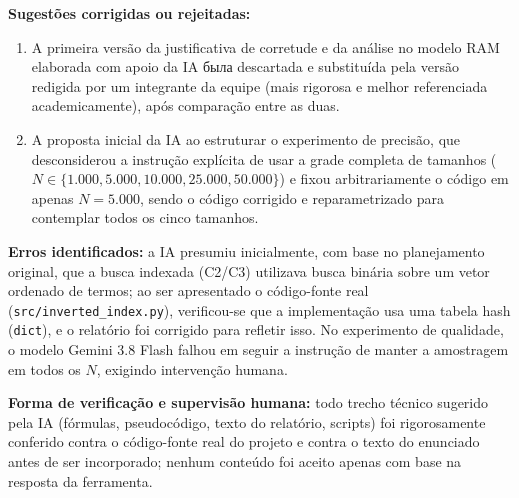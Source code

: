 \documentclass[12pt, a4paper]{article}
\begin{document}
\textbf{Sugestões corrigidas ou rejeitadas:}
\begin{enumerate}
    \item A primeira versão da justificativa de corretude e da análise no modelo RAM elaborada com apoio da IA была descartada e substituída pela versão redigida por um integrante da equipe (mais rigorosa e melhor referenciada academicamente), após comparação entre as duas.
    
    \item A proposta inicial da IA ao estruturar o experimento de precisão, que desconsiderou a instrução explícita de usar a grade completa de tamanhos ($N \in \{1.000, 5.000, 10.000, 25.000, 50.000\}$) e fixou arbitrariamente o código em apenas $N=5.000$, sendo o código corrigido e reparametrizado para contemplar todos os cinco tamanhos.
\end{enumerate}

\textbf{Erros identificados:} a IA presumiu inicialmente, com base no planejamento original, que a busca indexada (C2/C3) utilizava busca binária sobre um vetor ordenado de termos; ao ser apresentado o código-fonte real (\texttt{src/inverted\_index.py}), verificou-se que a implementação usa uma tabela hash (\texttt{dict}), e o relatório foi corrigido para refletir isso. No experimento de qualidade, o modelo Gemini 3.8 Flash falhou em seguir a instrução de manter a amostragem em todos os $N$, exigindo intervenção humana.

\textbf{Forma de verificação e supervisão humana:} todo trecho técnico sugerido pela IA (fórmulas, pseudocódigo, texto do relatório, scripts) foi rigorosamente conferido contra o código-fonte real do projeto e contra o texto do enunciado antes de ser incorporado; nenhum conteúdo foi aceito apenas com base na resposta da ferramenta.
\end{document}
